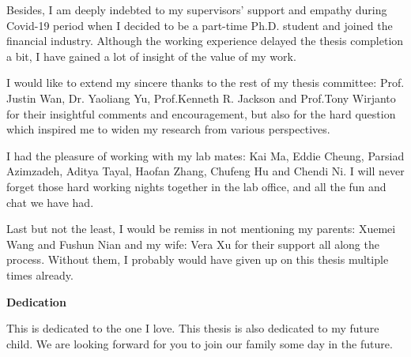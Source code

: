 Besides, I am deeply indebted to my supervisors' support and empathy during Covid-19 period when I decided to be a part-time Ph.D. student and joined the financial industry. Although the working experience delayed the thesis completion a bit, I have gained a lot of insight of the value of my work. 
 
I would like to extend my sincere thanks to
the rest of my thesis committee: Prof. Justin Wan, Dr. Yaoliang Yu, Prof.Kenneth R. Jackson and Prof.Tony Wirjanto for their insightful comments and encouragement, but also for the hard question which inspired me to widen my research from various perspectives.


I had the pleasure of working with my 
lab mates: Kai Ma, Eddie Cheung, Parsiad Azimzadeh, Aditya  Tayal, Haofan Zhang, Chufeng Hu and Chendi Ni.
I will never forget those hard working nights together in the lab office, and all the fun and chat we have had.

Last but not the least, I would be remiss in not mentioning my parents: Xuemei Wang and Fushun Nian and my wife: Vera Xu for their support all along the process.  Without them, I probably would have given up on this thesis multiple times already.
\cleardoublepage


\begin{center}\textbf{Dedication}\end{center}

This is dedicated to the one I love. This thesis is also dedicated to my future child. We are looking forward for you to join our family some day in the future.
\cleardoublepage

\renewcommand\contentsname{Table of Contents}
\tableofcontents
\cleardoublepage
{}    %

\listoftables
\cleardoublepage
{}		%

\listoffigures
\cleardoublepage
{}		%



\listofalgorithms
\cleardoublepage
{}		%
\printglossaries
\cleardoublepage
{}		%


